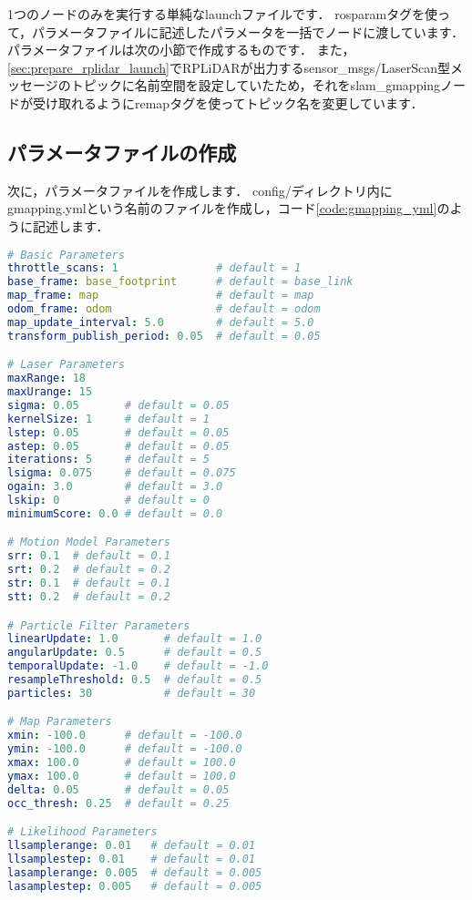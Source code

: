 \documentclass[{../../master}]{subfiles}
\begin{document}
1つのノードのみを実行する単純なlaunchファイルです．
\textsf{rosparam}タグを使って，パラメータファイルに記述したパラメータを一括でノードに渡しています．
パラメータファイルは次の小節で作成するものです．
また，\ref{sec:prepare_rplidar_launch}でRPLiDARが出力する\textsf{sensor\_msgs/LaserScan}型メッセージのトピックに名前空間を設定していたため，それを\textsf{slam\_gmapping}ノードが受け取れるように\textsf{remap}タグを使ってトピック名を変更しています．

\subsection{パラメータファイルの作成}

次に，パラメータファイルを作成します．
\textsf{config/}ディレクトリ内に\textsf{gmapping.yml}という名前のファイルを作成し，コード\ref{code:gmapping_yml}のように記述します．

\begin{lstlisting}[language=YAML, label=code:gmapping_yml, caption=\textsf{gmapping.yml}]
# Basic Parameters
throttle_scans: 1               # default = 1
base_frame: base_footprint      # default = base_link
map_frame: map                  # default = map
odom_frame: odom                # default = odom
map_update_interval: 5.0        # default = 5.0
transform_publish_period: 0.05  # default = 0.05

# Laser Parameters
maxRange: 18
maxUrange: 15
sigma: 0.05       # default = 0.05
kernelSize: 1     # default = 1
lstep: 0.05       # default = 0.05
astep: 0.05       # default = 0.05
iterations: 5     # default = 5
lsigma: 0.075     # default = 0.075
ogain: 3.0        # default = 3.0
lskip: 0          # default = 0
minimumScore: 0.0 # default = 0.0

# Motion Model Parameters
srr: 0.1  # default = 0.1
srt: 0.2  # default = 0.2
str: 0.1  # default = 0.1
stt: 0.2  # default = 0.2

# Particle Filter Parameters
linearUpdate: 1.0       # default = 1.0
angularUpdate: 0.5      # default = 0.5
temporalUpdate: -1.0    # default = -1.0
resampleThreshold: 0.5  # default = 0.5
particles: 30           # default = 30

# Map Parameters
xmin: -100.0      # default = -100.0
ymin: -100.0      # default = -100.0
xmax: 100.0       # default = 100.0
ymax: 100.0       # default = 100.0
delta: 0.05       # default = 0.05
occ_thresh: 0.25  # default = 0.25

# Likelihood Parameters
llsamplerange: 0.01   # default = 0.01
llsamplestep: 0.01    # default = 0.01
lasamplerange: 0.005  # default = 0.005
lasamplestep: 0.005   # default = 0.005
\end{lstlisting}
\end{document}
